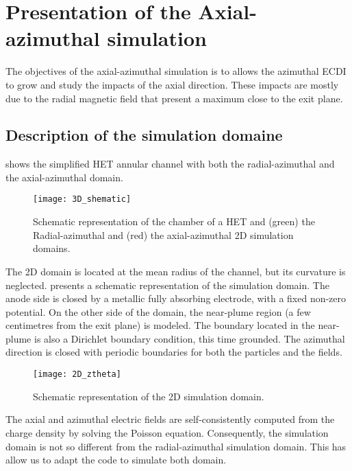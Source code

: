 
\section{Presentation of the Axial-azimuthal simulation}

The objectives of the axial-azimuthal simulation is to allows the azimuthal \ac{ECDI} to grow and study the impacts of the axial direction.
These impacts are mostly due to the radial magnetic field  that present a maximum close to the exit plane.

\subsection{Description of the simulation domaine} \label{subsec-ztheta_description}
 shows the simplified \ac{HET} annular channel with both the radial-azimuthal and the axial-azimuthal \ztheta domain.

\begin{figure}[hbt]
  \centering
  \texttt{[image: 3D\_shematic]}
  \caption{Schematic representation of the chamber of a \ac{HET} and (green) the Radial-azimuthal and (red) the axial-azimuthal 2D simulation domains.}
  \label{fig-3Dschematic}
\end{figure}

The \ac{2D} \ztheta domain is located at the mean radius of the channel, but its curvature is neglected.
 presents a schematic representation of the \ztheta simulation domain.
The anode side is closed by a metallic fully absorbing electrode, with a fixed non-zero potential.
On the other side of the domain, the near-plume region (a few centimetres from the exit plane) is modeled.
The boundary located in the near-plume is also a Dirichlet boundary condition, this time grounded.
The azimuthal direction is closed with periodic boundaries for both the particles and the fields.

\begin{figure}[hbt]
  \centering
  \texttt{[image: 2D\_ztheta]}
  \caption{Schematic representation of the \ac{2D} \ztheta simulation domain.}
  \label{fig-2D_ztheta_bis}
\end{figure}

The axial and azimuthal electric fields are self-consistently computed from the charge density by solving the Poisson equation.
Consequently, the simulation domain is not so different from the radial-azimuthal simulation domain.
This has allow us to adapt the code \LPPic to simulate both domain.

